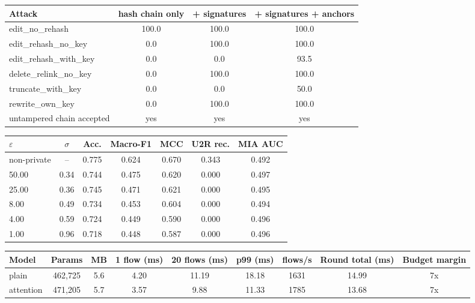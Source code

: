 \begin{tabular}{lccc}
\toprule
Attack & hash chain only & + signatures & + signatures + anchors \\
\midrule
edit\_no\_rehash & 100.0 & 100.0 & 100.0 \\
edit\_rehash\_no\_key & 0.0 & 100.0 & 100.0 \\
edit\_rehash\_with\_key & 0.0 & 0.0 & 93.5 \\
delete\_relink\_no\_key & 0.0 & 100.0 & 100.0 \\
truncate\_with\_key & 0.0 & 0.0 & 50.0 \\
rewrite\_own\_key & 0.0 & 100.0 & 100.0 \\
untampered chain accepted & yes & yes & yes \\
\bottomrule
\end{tabular}

\begin{tabular}{lcccccc}
\toprule
$\varepsilon$ & $\sigma$ & Acc. & Macro-F1 & MCC & U2R rec. & MIA AUC \\
\midrule
non-private & -- & 0.775 & 0.624 & 0.670 & 0.343 & 0.492 \\
50.00 & 0.34 & 0.744 & 0.475 & 0.620 & 0.000 & 0.497 \\
25.00 & 0.36 & 0.745 & 0.471 & 0.621 & 0.000 & 0.495 \\
8.00 & 0.49 & 0.734 & 0.453 & 0.604 & 0.000 & 0.494 \\
4.00 & 0.59 & 0.724 & 0.449 & 0.590 & 0.000 & 0.496 \\
1.00 & 0.96 & 0.718 & 0.448 & 0.587 & 0.000 & 0.496 \\
\bottomrule
\end{tabular}

\begin{tabular}{lcccccccc}
\toprule
Model & Params & MB & 1 flow (ms) & 20 flows (ms) & p99 (ms) & flows/s & Round total (ms) & Budget margin \\
\midrule
plain & 462,725 & 5.6 & 4.20 & 11.19 & 18.18 & 1631 & 14.99 & 7x \\
attention & 471,205 & 5.7 & 3.57 & 9.88 & 11.33 & 1785 & 13.68 & 7x \\
\bottomrule
\end{tabular}

